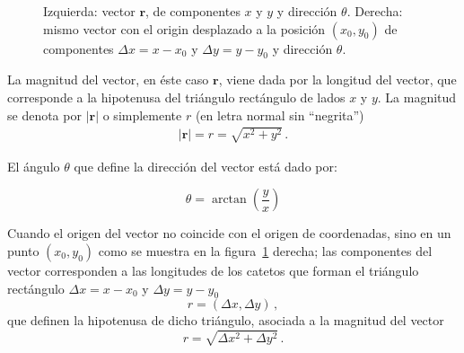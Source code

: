 \documentclass[11pt,a4paper]{book}
\begin{document}
\begin{figure}


    \caption{Izquierda: vector $\boldsymbol{r}$, de componentes $x$ y $y$ y dirección $\theta$. Derecha: mismo vector con el origin desplazado a la posición $(x_0,y_0)$  de componentes $\Delta x =x-x_0$ y $\Delta y = y-y_0$ y dirección $\theta$. }
    \label{fig:vectorr}
\end{figure}
La magnitud del vector, en éste caso $\boldsymbol{r}$, viene dada por la longitud del vector, que corresponde a la hipotenusa del triángulo rectángulo de lados $x$ y $y$. La magnitud se denota por $|\boldsymbol{r}|$ o simplemente $r$ (en letra normal sin ``negrita'')
\begin{align}
  |\boldsymbol{r}| =  r = \sqrt{x^2+y^2}\,.
\end{align}

El ángulo $\theta$ que define la dirección del vector está dado por:

$$\theta = \arctan{\left(\frac{y}{x}\right)}$$

Cuando el origen del vector no coincide con el origen de coordenadas, sino en un punto $(x_0,y_0)$ como se muestra en la figura~\ref{fig:vectorr} derecha; las componentes del vector corresponden a las longitudes de los catetos que forman el triángulo rectángulo $\Delta x=x-x_0$ y $\Delta y=y-y_0$
\begin{equation}
    r=(\Delta x, \Delta y)\,,
\end{equation}
que definen la hipotenusa de dicho triángulo,  asociada a la magnitud del vector
\begin{equation}
    r=\sqrt{\Delta x^2+\Delta y^2}\,.
\end{equation}
\end{document}
